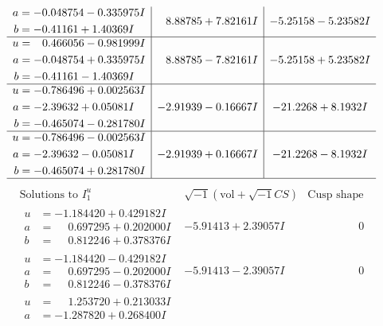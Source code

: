 \documentclass[1p]{elsarticle_modified}
\theoremstyle{definition}
\newcommand{\I}{\sqrt{-1}}
\begin{document}
$$\begin{array}{c|c|c}
\begin{aligned}
a &= -0.048754 - 0.335975 I \\
b &= -0.41161 + 1.40369 I\end{aligned}
 & \phantom{-}8.88785 + 7.82161 I & -5.25158 - 5.23582 I \\ \hline\begin{aligned}
u &= \phantom{-}0.466056 - 0.981999 I \\
a &= -0.048754 + 0.335975 I \\
b &= -0.41161 - 1.40369 I\end{aligned}
 & \phantom{-}8.88785 - 7.82161 I & -5.25158 + 5.23582 I \\ \hline\begin{aligned}
u &= -0.786496 + 0.002563 I \\
a &= -2.39632 + 0.05081 I \\
b &= -0.465074 - 0.281780 I\end{aligned}
 & -2.91939 - 0.16667 I & -21.2268 + 8.1932 I \\ \hline\begin{aligned}
u &= -0.786496 - 0.002563 I \\
a &= -2.39632 - 0.05081 I \\
b &= -0.465074 + 0.281780 I\end{aligned}
 & -2.91939 + 0.16667 I & -21.2268 - 8.1932 I\\
 \hline 
 \end{array}$$\newpage$$\begin{array}{c|c|c}  
\text{Solutions to }I^u_{1}& \I (\text{vol} + \sqrt{-1}CS) & \text{Cusp shape}\\
 \hline 
\begin{aligned}
u &= -1.184420 + 0.429182 I \\
a &= \phantom{-}0.697295 + 0.202000 I \\
b &= \phantom{-}0.812246 + 0.378376 I\end{aligned}
 & -5.91413 + 2.39057 I & \phantom{-0.000000 } 0 \\ \hline\begin{aligned}
u &= -1.184420 - 0.429182 I \\
a &= \phantom{-}0.697295 - 0.202000 I \\
b &= \phantom{-}0.812246 - 0.378376 I\end{aligned}
 & -5.91413 - 2.39057 I & \phantom{-0.000000 } 0 \\ \hline\begin{aligned}
u &= \phantom{-}1.253720 + 0.213033 I \\
a &= -1.287820 + 0.268400 I \\

\end{aligned}
\end{array}$$
\end{document}
